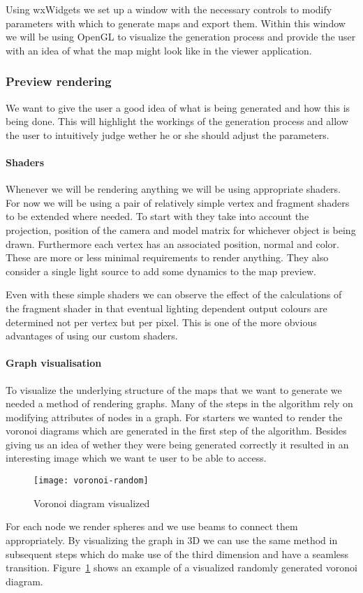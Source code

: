 Using wxWidgets we set up a window with the necessary controls to modify parameters with which to generate maps and export them. Within this window we will be using OpenGL to visualize the generation process and provide the user with an idea of what the map might look like in the viewer application.

\subsubsection{Preview rendering}

We want to give the user a good idea of what is being generated and how this is being done. This will highlight the workings of the generation process and allow the user to intuitively judge wether he or she should adjust the parameters.

\paragraph{Shaders}

Whenever we will be rendering anything we will be using appropriate shaders. For now we will be using a pair of relatively simple vertex and fragment shaders to be extended where needed. To start with they take into account the projection, position of the camera and model matrix for whichever object is being drawn. Furthermore each vertex has an associated position, normal and color. These are more or less minimal requirements to render anything. They also consider a single light source to add some dynamics to the map preview. 

Even with these simple shaders we can observe the effect of the calculations of the fragment shader in that eventual lighting dependent output colours are determined not per vertex but per pixel. This is one of the more obvious advantages of using our custom shaders.

\paragraph{Graph visualisation}

To visualize the underlying structure of the maps that we want to generate we needed a method of rendering graphs. Many of the steps in the algorithm rely on modifying attributes of nodes in a graph. For starters we wanted to render the voronoi diagrams which are generated in the first step of the algorithm. Besides giving us an idea of wether they were being generated correctly it resulted in an interesting image which we want te user to be able to access.

\begin{figure}[h]
	\centering
	\texttt{[image: voronoi-random]}
	\caption{Voronoi diagram visualized}
	\label{fig:voronoi-random}
\end{figure}

For each node we render spheres and we use beams to connect them appropriately. By visualizing the graph in 3D we can use the same method in subsequent steps which do make use of the third dimension and have a seamless transition. Figure~\ref{fig:voronoi-random} shows an example of a visualized randomly generated voronoi diagram.
